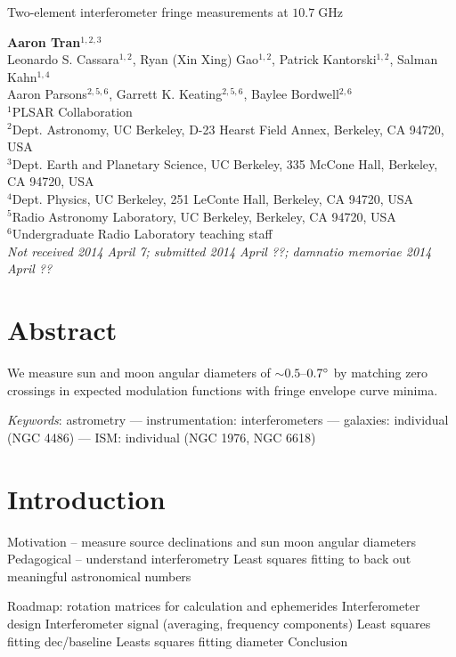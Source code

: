 \documentclass[10pt]{article}
\newcommand {\mt}{\mathrm}
\newcommand {\unit}[1]{\; \mt{#1}}
\begin{document}
\begin{center}
\Large{Two-element interferometer fringe measurements at $10.7 \unit{GHz}$}

\normalsize
\textbf{Aaron Tran}${}^{1,2,3}$ \\
Leonardo S. Cassara${}^{1,2}$, Ryan (Xin Xing) Gao${}^{1,2}$, Patrick Kantorski${}^{1,2}$, Salman Kahn${}^{1,4}$ \\
Aaron Parsons${}^{2,5,6}$, Garrett K. Keating${}^{2,5,6}$, Baylee Bordwell${}^{2,6}$ \\
\footnotesize
${}^1$PLSAR Collaboration \\
${}^2$Dept. Astronomy, UC Berkeley, D-23 Hearst Field Annex, Berkeley, CA 94720, USA \\
${}^3$Dept. Earth and Planetary Science, UC Berkeley, 335 McCone Hall, Berkeley, CA 94720, USA \\
${}^4$Dept. Physics, UC Berkeley, 251 LeConte Hall, Berkeley, CA 94720, USA \\
${}^5$Radio Astronomy Laboratory, UC Berkeley, Berkeley, CA 94720, USA \\
${}^6$Undergraduate Radio Laboratory teaching staff \\
\textit{Not received 2014 April 7; submitted 2014 April ??; damnatio memoriae 2014 April ??}
\end{center}

\section*{Abstract}

We measure sun and moon angular diameters of $\sim 0.5$--$0.7\degree$ by matching zero crossings in expected modulation functions with fringe envelope curve minima.

\textit{Keywords}: astrometry --- instrumentation: interferometers --- galaxies: individual (NGC 4486) --- ISM: individual (NGC 1976, NGC 6618)

\section{Introduction}

Motivation -- measure source declinations and sun moon angular diameters
Pedagogical -- understand interferometry
Least squares fitting to back out meaningful astronomical numbers

Roadmap:
rotation matrices for calculation and ephemerides
Interferometer design
Interferometer signal (averaging, frequency components)
Least squares fitting dec/baseline
Leasts squares fitting diameter
Conclusion
\end{document}
